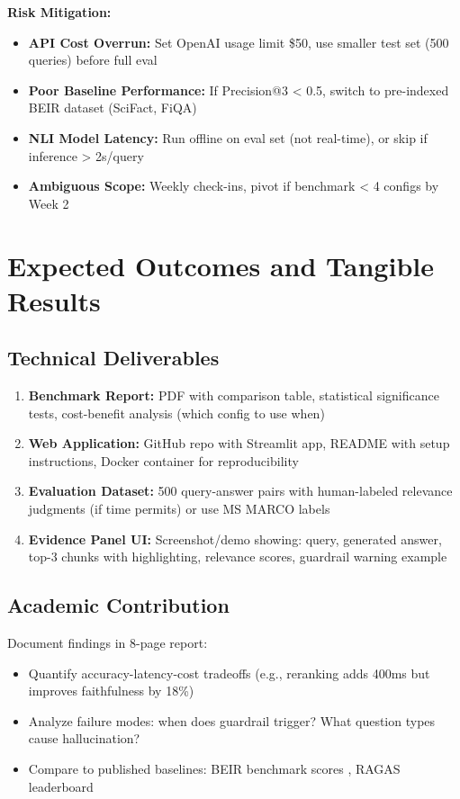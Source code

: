 \documentclass[11pt,a4paper]{article}
\begin{document}
\textbf{Risk Mitigation:}
\begin{itemize}[leftmargin=*,nosep]
    \item \textbf{API Cost Overrun:} Set OpenAI usage limit \$50, use smaller test set (500 queries) before full eval
    \item \textbf{Poor Baseline Performance:} If Precision@3 < 0.5, switch to pre-indexed BEIR dataset (SciFact, FiQA)
    \item \textbf{NLI Model Latency:} Run offline on eval set (not real-time), or skip if inference > 2s/query
    \item \textbf{Ambiguous Scope:} Weekly check-ins, pivot if benchmark < 4 configs by Week 2
\end{itemize}

\section{Expected Outcomes and Tangible Results}

\subsection{Technical Deliverables}
\begin{enumerate}[leftmargin=*]
    \item \textbf{Benchmark Report:} PDF with comparison table, statistical significance tests, cost-benefit analysis (which config to use when)
    \item \textbf{Web Application:} GitHub repo with Streamlit app, README with setup instructions, Docker container for reproducibility
    \item \textbf{Evaluation Dataset:} 500 query-answer pairs with human-labeled relevance judgments (if time permits) or use MS MARCO labels
    \item \textbf{Evidence Panel UI:} Screenshot/demo showing: query, generated answer, top-3 chunks with highlighting, relevance scores, guardrail warning example
\end{enumerate}

\subsection{Academic Contribution}
Document findings in 8-page report:
\begin{itemize}[leftmargin=*,nosep]
    \item Quantify accuracy-latency-cost tradeoffs (e.g., reranking adds 400ms but improves faithfulness by 18\%)
    \item Analyze failure modes: when does guardrail trigger? What question types cause hallucination?
    \item Compare to published baselines: BEIR benchmark scores \cite{thakur2021beir}, RAGAS leaderboard \cite{ragas2024}
\end{itemize}
\end{document}
